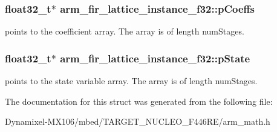 \subsubsection[{\texorpdfstring{p\+Coeffs}{pCoeffs}}]{\setlength{\rightskip}{0pt plus 5cm}float32\+\_\+t$\ast$ arm\+\_\+fir\+\_\+lattice\+\_\+instance\+\_\+f32\+::p\+Coeffs}\hypertarget{structarm__fir__lattice__instance__f32_a33bf5948c947f9ef80a99717cb0a0a43}{}\label{structarm__fir__lattice__instance__f32_a33bf5948c947f9ef80a99717cb0a0a43}
points to the coefficient array. The array is of length num\+Stages. 
\subsubsection[{\texorpdfstring{p\+State}{pState}}]{\setlength{\rightskip}{0pt plus 5cm}float32\+\_\+t$\ast$ arm\+\_\+fir\+\_\+lattice\+\_\+instance\+\_\+f32\+::p\+State}\hypertarget{structarm__fir__lattice__instance__f32_ae348884a1ba9b83fadccd5da640cbcaf}{}\label{structarm__fir__lattice__instance__f32_ae348884a1ba9b83fadccd5da640cbcaf}
points to the state variable array. The array is of length num\+Stages. 

The documentation for this struct was generated from the following file\+:\begin{DoxyCompactItemize}
\item 
Dynamixel-\/\+M\+X106/mbed/\+T\+A\+R\+G\+E\+T\+\_\+\+N\+U\+C\+L\+E\+O\+\_\+\+F446\+R\+E/arm\+\_\+math.\+h\end{DoxyCompactItemize}
